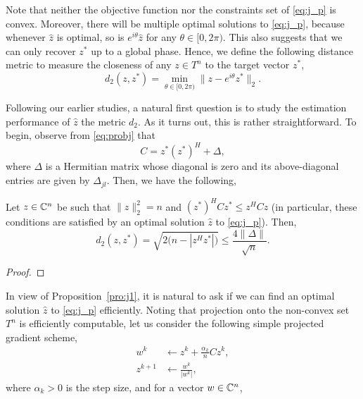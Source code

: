 Note that neither the objective function nor the constraints set of
\eqref{eq:j_p} is convex.
Moreover,
there will be multiple optimal solutions to \eqref{eq:j_p},
because whenever $\hat z$ is optimal,
so is $e^{i\theta}\hat z$ for any $\theta\in[0,2\pi)$.
This also suggests that we can only recover $z^*$ up to a global phase.
Hence,
we define the following distance metric to measure the closeness of
any $z\in T^n$ to the target vector $z^*$,
\begin{equation}
    d_2(z,z^*)=\min_{\theta\in[0,2\pi)}\|z-e^{i\theta}z^*\|_2.
\end{equation}

Following our earlier studies,
a natural first question is to study the estimation performance of $\hat z$
\wrt the metric $d_2$.
As it turns out,
this is rather straightforward.
To begin,
observe from \eqref{eq:probj} that
\begin{equation}
    C=z^*(z^*)^H+\Delta,
\end{equation}
where $\Delta$ is a Hermitian matrix whose diagonal is zero
and its above-diagonal entries are given by $\Delta_{jl}$.
Then,
we have the following,
\begin{pro}\label{pro:j1}
Let $z\in{\mathbb{C}}^n$ be such that $\|z\|_2^2=n$ and $(z^*)^HCz^*\le z^HCz$
(in particular,
these conditions are satisfied by an optimal solution
$\hat z$ to \eqref{eq:j_p}).
Then,
\begin{equation}
    d_2(z,z^*) = \sqrt{2\big(n-|z^Hz^*|\big)}\le\frac{4\|\Delta\|}{\sqrt{n}}.
\end{equation}
\end{pro}
\begin{proof}
\todo
\end{proof}

In view of Proposition~\ref{pro:j1},
it is natural to ask if we can find an optimal solution $\hat z$
to \eqref{eq:j_p} efficiently.
Noting that projection onto the non-convex set $T^n$ is efficiently computable,
let us consider the following simple projected gradient scheme,
\begin{equation}
\begin{split}
    w^k &\leftarrow z^k + \frac{\alpha_k}{n}Cz^k, \\
    z^{k+1}&\leftarrow \frac{w^k}{|w^k|},
\end{split}
\end{equation}
where $\alpha_k>0$ is the step size,
and for a vector $w\in{\mathbb{C}}^n$,
\todo

